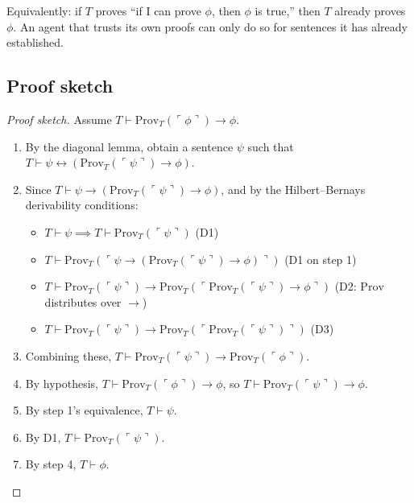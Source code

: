 \documentclass[11pt,a4paper]{article}
\theoremstyle{definition}
\theoremstyle{remark}
\newcommand{\Prov}{\mathrm{Prov}}
\begin{document}
Equivalently: if $T$ proves ``if I can prove $\phi$, then $\phi$ is
true,'' then $T$ already proves $\phi$.  An agent that trusts its own
proofs can only do so for sentences it has already established.

\subsection{Proof sketch}

\begin{proof}[Proof sketch]
Assume $T \vdash \Prov_T(\ulcorner \phi \urcorner) \to \phi$.
\begin{enumerate}
  \item By the diagonal lemma, obtain a sentence $\psi$ such that
    $T \vdash \psi \leftrightarrow (\Prov_T(\ulcorner \psi \urcorner)
    \to \phi)$.
  \item Since $T \vdash \psi \to (\Prov_T(\ulcorner \psi \urcorner)
    \to \phi)$, and by the Hilbert--Bernays derivability conditions:
    \begin{itemize}
      \item $T \vdash \psi \implies T \vdash \Prov_T(\ulcorner \psi
        \urcorner)$ \hfill (D1)
      \item $T \vdash \Prov_T(\ulcorner \psi \to (\Prov_T(\ulcorner
        \psi \urcorner) \to \phi) \urcorner)$ \hfill (D1 on step 1)
      \item $T \vdash \Prov_T(\ulcorner \psi \urcorner) \to
        \Prov_T(\ulcorner \Prov_T(\ulcorner \psi \urcorner) \to \phi
        \urcorner)$ \hfill (D2: $\Prov$ distributes over $\to$)
      \item $T \vdash \Prov_T(\ulcorner \psi \urcorner) \to
        \Prov_T(\ulcorner \Prov_T(\ulcorner \psi \urcorner) \urcorner)
        $ \hfill (D3)
    \end{itemize}
  \item Combining these, $T \vdash \Prov_T(\ulcorner \psi \urcorner)
    \to \Prov_T(\ulcorner \phi \urcorner)$.
  \item By hypothesis, $T \vdash \Prov_T(\ulcorner \phi \urcorner) \to
    \phi$, so $T \vdash \Prov_T(\ulcorner \psi \urcorner) \to \phi$.
  \item By step 1's equivalence, $T \vdash \psi$.
  \item By D1, $T \vdash \Prov_T(\ulcorner \psi \urcorner)$.
  \item By step 4, $T \vdash \phi$.  \qedhere
\end{enumerate}
\end{proof}
\end{document}
